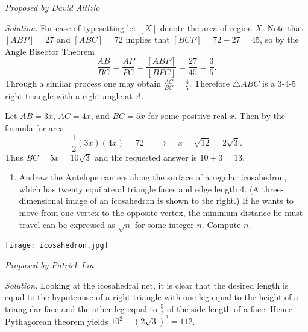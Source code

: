 \documentclass[10pt]{article}
\newcommand{\proposed}[1]
{
\vspace{5pt}
\noindent\textit{Proposed by #1}
}
\newcommand{\solution}
{
\vspace{5pt}
\noindent\textit{Solution.}\qquad
}
\newcounter{enum}
\begin{document}
\begin{enumerate}
\proposed{David Altizio}

\solution For ease of typesetting let $[X]$ denote the area of region $X$.  Note that $[ABP]=27$ and $[ABC]=72$ implies that $[BCP]=72-27=45$, so by the Angle Bisector Theorem \[\dfrac{AB}{BC}=\dfrac{AP}{PC}=\dfrac{[ABP]}{[BPC]}=\dfrac{27}{45}=\frac{3}{5}.\] Through a similar process one may obtain $\tfrac{AC}{BC}=\tfrac45$.  Therefore $\triangle ABC$ is a 3-4-5 right triangle with a right angle at $A$.

\par Let $AB=3x$, $AC=4x$, and $BC=5x$ for some positive real $x$.  Then by the formula for area \[\dfrac12(3x)(4x) = 72\quad\implies\quad x=\sqrt{12}=2\sqrt3.\] Thus $BC=5x=10\sqrt3$ and the requested answer is $10+3=\boxed{13}$.

\setcounter{enum}{\theenumi}
\end{enumerate}

\hspace*{-\parindent}%
\begin{minipage}{0.85\textwidth}
\begin{enumerate}
\setcounter{enumi}{\theenum}
\item Andrew the Antelope canters along the surface of a regular icosahedron, which has twenty equilateral triangle faces and edge length 4. (A three-dimensional image of an icosahedron is shown to the right.) If he wants to move from one vertex to the opposite vertex, the minimum distance he must travel can be expressed as $\sqrt{n}$ for some integer $n$.  Compute $n$. %
\setcounter{enum}{\theenumi}
\end{enumerate}

\end{minipage} \hfill
\begin{minipage}{0.12\textwidth}

\texttt{[image: icosahedron.jpg]}
\end{minipage}

\hfill
\begin{minipage}{0.95\textwidth}
\proposed{Patrick Lin}

\solution Looking at the icosahedral net, it is clear that the desired length is equal to the hypotenuse of a right triangle with one leg equal to the height of a triangular face and the other leg equal to $\tfrac52$ of the side length of a face. Hence Pythagorean theorem yields $10^2+(2\sqrt{3})^2 = \boxed{112}$.
\end{minipage}
\end{document}
